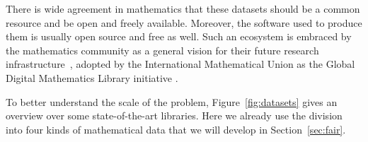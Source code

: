 There is wide agreement in mathematics that these datasets should be a common resource and be open and freely available.
Moreover, the software used to produce them is usually open source and free as well.
Such an ecosystem is embraced by the mathematics community as a general vision for their future research infrastructure~\cite{NAS14}, adopted by the International Mathematical Union as the Global Digital Mathematics Library initiative \cite{GDML:on}.

To better understand the scale of the problem, Figure~\ref{fig:datasets} gives an overview over some state-of-the-art libraries.
Here we already use the division into four kinds of mathematical data that we will develop in Section~\ref{sec:fair}.

